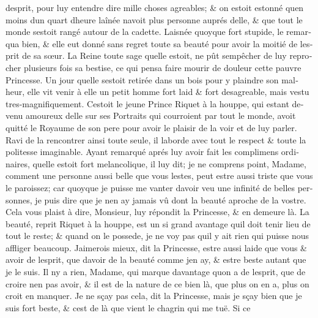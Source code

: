 \documentclass[14pt,a4paper]{memoir}
\begin{document}
{{\begin{otherlanguage}{french}
d\textquotesingle esprit, pour luy entendre dire mille choses agreables;
\& on estoit estonné qu\textquotesingle en moins d\textquotesingle un
quart d\textquotesingle heure l\textquotesingle aînée
n\textquotesingle avoit plus personne auprés d\textquotesingle elle, \&
que tout le monde s\textquotesingle estoit rangé autour de la cadette.
L\textquotesingle aisnée quoyque fort stupide, le remarqua bien, \& elle
eut donné sans regret toute sa beauté pour avoir la moitié de
l\textquotesingle esprit de sa sœur. La Reine toute sage
qu\textquotesingle elle estoit, ne pût s\textquotesingle empêcher de luy
reprocher plusieurs fois sa bestise, ce qui pensa faire mourir de
douleur cette pauvre Princesse. Un jour qu\textquotesingle elle
s\textquotesingle estoit retirée dans un bois pour y plaindre son
malheur, elle vit venir à elle un petit homme fort laid \& fort
desagreable, mais vestu tres-magnifiquement. C\textquotesingle estoit le
jeune Prince Riquet à la houppe, qui estant devenu amoureux
d\textquotesingle elle sur ses Portraits qui courroient par tout le
monde, avoit quitté le Royaume de son pere pour avoir le plaisir de la
voir et de luy parler. Ravi de la rencontrer ainsi toute seule, il
l\textquotesingle aborde avec tout le respect \& toute la politesse
imaginable. Ayant remarqué aprés luy avoir fait les complimens
ordinaires, qu\textquotesingle elle estoit fort melancolique, il luy
dit; je ne comprens point, Madame, comment une personne aussi belle que
vous l\textquotesingle estes, peut estre aussi triste que vous le
paroissez; car quoyque je puisse me vanter d\textquotesingle avoir veu
une infinité de belles personnes, je puis dire que je
n\textquotesingle en ay jamais vû dont la beauté aproche de la vostre.
Cela vous plaist à dire, Monsieur, luy répondit la Princesse, \& en
demeure là. La beauté, reprit Riquet à la houppe, est un si grand
avantage qu\textquotesingle il doit tenir lieu de tout le reste; \&
quand on le possede, je ne voy pas qu\textquotesingle il y ait rien qui
puisse nous affliger beaucoup. J\textquotesingle aimerois mieux, dit la
Princesse, estre aussi laide que vous \& avoir de
l\textquotesingle esprit, que d\textquotesingle avoir de la beauté comme
j\textquotesingle en ay, \& estre beste autant que je le suis. Il
n\textquotesingle y a rien, Madame, qui marque davantage
qu\textquotesingle on a de l\textquotesingle esprit, que de croire
n\textquotesingle en pas avoir, \& il est de la nature de ce bien là,
que plus on en a, plus on croit en manquer. Je ne sçay pas cela, dit la
Princesse, mais je sçay bien que je suis fort beste, \&
c\textquotesingle est de là que vient le chagrin qui me tuë. Si ce

\end{otherlanguage}}}
\end{document}
